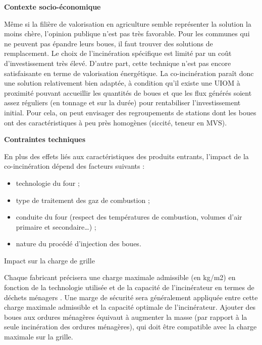 \vspace{0.3cm}
\textbf{Contexte socio-économique}
\vspace{0.3cm}

Même si la filière de valorisation en agriculture semble représenter la solution la moins chère, l’opinion publique n’est pas très favorable. Pour les communes qui ne peuvent pas épandre leurs boues, il faut trouver des solutions de remplacement.
Le choix de l’incinération spécifique est limité par un coût d’investissement très élevé. D’autre part, cette technique n’est pas encore satisfaisante en terme de valorisation énergétique. La co-incinération paraît donc une solution relativement bien adaptée, à condition qu’il existe une UIOM à proximité pouvant accueillir les quantités de boues et que les flux générés soient assez réguliers (en tonnage et sur la durée) pour rentabiliser l’investissement initial. Pour cela, on peut envisager des regroupements de stations dont les boues ont des caractéristiques à peu près homogènes (siccité, teneur en MVS).

\vspace{0.3cm}
\textbf{Contraintes techniques}
\vspace{0.3cm}

En plus des effets liés aux caractéristiques des produits entrants, l’impact de la co-incinération dépend des facteurs suivants :
\begin{itemize}
\item technologie du four ;
\item type de traitement des gaz de combustion ;
\item  conduite du four (respect des températures de combustion, volumes d’air primaire et secondaire…) ;
\item nature du procédé d’injection des boues.
\end{itemize}

\vspace{0.3cm}
Impact sur la charge de grille
\vspace{0.3cm}

Chaque fabricant précisera une charge maximale admissible (en kg/m2) en fonction de la technologie utilisée et de la capacité de l'incinérateur en termes de déchets ménagers . Une marge de sécurité sera généralement appliquée entre cette charge maximale admissible et la capacité optimale de l'incinérateur. Ajouter des boues aux ordures ménagères équivaut à augmenter la masse (par rapport à la seule incinération des ordures ménagères), qui doit être compatible avec la charge maximale sur la grille.



